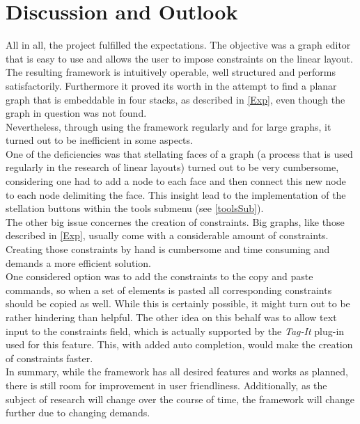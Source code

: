 
\chapter{Discussion and Outlook}
  \label{Discussion}

All in all, the project fulfilled the expectations. The objective was a graph editor that is easy to use and allows the user to impose constraints on the linear layout. The resulting framework is intuitively operable, well structured and performs satisfactorily. Furthermore it proved its worth in the attempt to find a planar graph that is embeddable in four stacks, as described in \autoref{Exp}, even though the graph in question was not found.\\
Nevertheless, through using the framework regularly and for large graphs, it turned out to be inefficient in some aspects.\\
One of the deficiencies was that stellating faces of a graph (a process that is used regularly in the research of linear layouts) turned out to be very cumbersome, considering one had to add a node to each face and then connect this new node to each node delimiting the face. This insight lead to the implementation of the stellation buttons within the tools submenu (see \autoref{toolsSub}).\\
The other big issue concernes the creation of constraints. Big graphs, like those described in \autoref{Exp}, usually come with a considerable amount of constraints. Creating those constraints by hand is cumbersome and time consuming and demands a more efficient solution.\\
One considered option was to add the constraints to the copy and paste commands, so when a set of elements is pasted all corresponding constraints should be copied as well. While this is certainly possible, it might turn out to be rather hindering than helpful. The other idea on this behalf was to allow text input to the constraints field, which is actually supported by the \textit{Tag-It} plug-in used for this feature. This, with added auto completion, would make the creation of constraints faster. \\
In summary, while the framework has all desired features and works as planned, there is still room for improvement in user friendliness. Additionally, as the subject of research will change over the course of time, the framework will change further due to changing demands.\\


